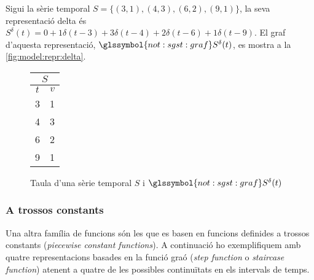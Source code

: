 \begin{example}
  Sigui la sèrie temporal $S=\{ (3,1), (4,3), (6,2), (9,1) \}$, la
  seva representació delta és $S^\delta(t) = 0 +1\delta(t-3)
  +3\delta(t-4) +2\delta(t-6) +1\delta(t-9)$. El graf d'aquesta
  representació, $\glssymbol{not:sgst:graf} S^\delta(t)$, es mostra a
  la \autoref{fig:model:repr:delta}.


  \begin{figure}[tp]
  \centering
  \begin{tabular}[c]{|c|c|}
    \multicolumn{2}{c}{$S$} \\ \hline
    $t$  & $v$ \\ \hline
    3  & 1 \\
    4  & 3 \\
    6  & 2 \\
    9  & 1 \\ \hline
  \end{tabular} \qquad
   \caption{Taula d'una sèrie temporal $S$ i
     $\glssymbol{not:sgst:graf} S^\delta(t)$}
  \label{fig:model:repr:delta}
  \end{figure}
\end{example}


\subsubsection{A trossos constants}

Una altra família de funcions són les que es basen en funcions
definides a trossos constants (\emph{piecewise constant functions}).
A continuació ho exemplifiquem amb quatre representacions basades en la
funció graó (\emph{step function} o \emph{staircase function}) atenent
a quatre de les possibles continuïtats en els intervals de temps. 


